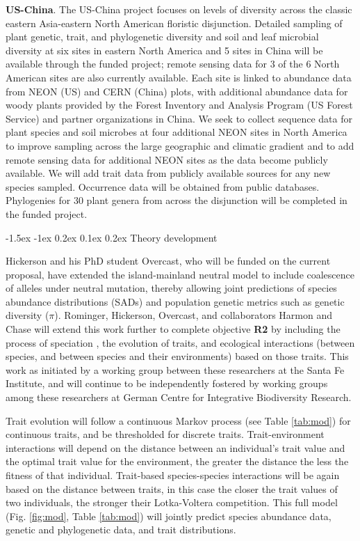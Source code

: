 \documentclass[11pt]{article}
\makeatletter
\renewcommand\subsubsection{\@startsection{subsection}{1}{\z@}%
                                  {-1.5ex \@plus -1ex \@minus 0.2ex}%
                                  {0.1ex \@plus 0.2ex}%
                                  {\normalfont\bfseries}}
\makeatother
\begin{document}
\textbf{US-China}. The US-China project focuses on levels of diversity
across the classic eastern Asia-eastern North American floristic
disjunction. Detailed sampling of plant genetic, trait, and
phylogenetic diversity and soil and leaf microbial diversity at six
sites in eastern North America and 5 sites in China will be available
through the funded project; remote sensing data for 3 of the 6 North
American sites are also currently available. Each site is linked to
abundance data from NEON (US) and CERN (China) plots, with additional
abundance data for woody plants provided by the Forest Inventory and
Analysis Program (US Forest Service) and partner organizations in
China. We seek to collect sequence data for plant species and soil
microbes at four additional NEON sites in North America to improve
sampling across the large geographic and climatic gradient and to add
remote sensing data for additional NEON sites as the data become
publicly available. We will add trait data from publicly available
sources for any new species sampled. Occurrence data will be obtained
from public databases. Phylogenies for 30 plant genera from across the
disjunction will be completed in the funded project.


\subsubsection{Theory development}\label{theory-development}

Hickerson and his PhD student Overcast, who will be funded on the
current proposal, have extended the island-mainland neutral model
\cite{Rosindell2013-di} to include coalescence of alleles under
neutral mutation, thereby allowing joint predictions of species
abundance distributions (SADs) and population genetic metrics such as
genetic diversity ($\pi$). Rominger, Hickerson, Overcast, and
collaborators Harmon and Chase will extend this work further to
complete objective \textbf{R2} by including the process of speciation
\cite{Rosindell2010-gq}, the evolution of traits, and ecological
interactions (between species, and between species and their
environments) based on those traits. This work as initiated by a
working group between these researchers at the Santa Fe Institute, and
will continue to be independently fostered by working groups among
these researchers at German Centre for Integrative Biodiversity
Research.

Trait evolution will follow a continuous Markov process (see Table
\ref{tab:mod}) for continuous traits, and be thresholded
\cite{Felsenstein2012-aj} for discrete traits. Trait-environment
interactions will depend on the distance between an individual's trait
value and the optimal trait value for the environment, the greater the
distance the less the fitness of that individual. Trait-based
species-species interactions will be again based on the distance
between traits, in this case the closer the trait values of two
individuals, the stronger their Lotka-Voltera \cite{Wilson2003-kp}
competition. This full model (Fig. \ref{fig:mod}, Table \ref{tab:mod})
will jointly predict species abundance data, genetic and phylogenetic
data, and trait distributions.
\end{document}
